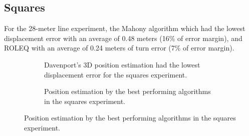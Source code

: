 \subsection{Squares}

For the 28-meter line experiment, the Mahony algorithm which had the lowest displacement error with an average of 0.48 meters (16\% of error margin), and ROLEQ with an average of 0.24 meters of turn error (7\% of error margin).

\begin{figure}[!h]
    \centering
    
\end{figure}

\begin{figure}[!h]
    \centering
    \begin{subfigure}{0.49\textwidth}
        \centering
        \resizebox{1\linewidth}{!}{}
        \caption{Davenport's 3D position estimation had the lowest displacement error for the squares experiment.}
        \label{fig:squares2D}
    \end{subfigure}
    \begin{subfigure}{0.49\textwidth}
        \centering
        \resizebox{1\linewidth}{!}{}
        \caption{Position estimation by the best performing algorithms in the squares experiment.}
        \label{fig:squares3D}
    \end{subfigure}
    \caption{Position estimation by the best performing algorithms in the squares experiment.}
    \label{fig:squares}
\end{figure}
